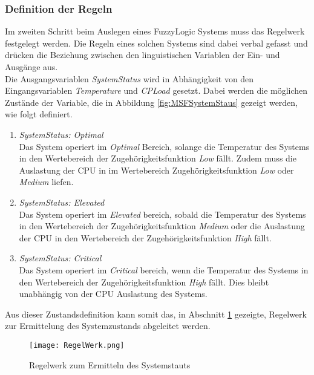 \subsubsection*{Definition der Regeln}
Im zweiten Schritt beim Auslegen eines FuzzyLogic Systems muss das Regelwerk festgelegt werden. Die Regeln eines solchen Systems sind dabei verbal gefasst und drücken die Beziehung zwischen den linguistischen Variablen der Ein- und Ausgänge aus.\cite{FLRegelwerk} \\
Die Ausgangsvariablen \textit{SystemStatus} wird in Abhängigkeit von den Eingangsvariablen \textit{Temperature} und \textit{CPLoad} gesetzt. Dabei werden die möglichen Zustände der Variable, die in Abbildung \ref{fig:MSFSystemStaus} gezeigt werden, wie folgt definiert. 
\begin{enumerate}
    \item \textit{SystemStatus: Optimal}\\
    Das System operiert im \textit{Optimal} Bereich, solange die Temperatur des Systems in den Wertebereich der Zugehörigkeitsfunktion \textit{Low} fällt. Zudem muss die Auslastung der CPU in im Wertebereich Zugehörigkeitsfunktion \textit{Low} oder \textit{Medium} liefen.  
    \item \textit{SystemStatus: Elevated}\\
    Das System operiert im \textit{Elevated} bereich, sobald die Temperatur des Systems in den Wertebereich der Zugehörigkeitsfunktion \textit{Medium} oder die Auslastung der CPU in den Wertebereich der Zugehörigkeitsfunktion \textit{High} fällt.
    \item \textit{SystemStatus: Critical}\\
    Das System operiert im \textit{Critical} bereich, wenn die Temperatur des Systems in den Wertebereich der Zugehörigkeitsfunktion \textit{High} fällt. Dies bleibt unabhängig von der CPU Auslastung des Systems. 
\end{enumerate}
Aus dieser Zustandsdefinition kann somit das, in Abschnitt \ref{fig:FuzzyLogicRuleBase} gezeigte, Regelwerk zur Ermittelung des Systemzustands abgeleitet werden.  
\begin{center}
    \begin{figure}[h!]
        \centering
        \texttt{[image: RegelWerk.png]}
        \caption{Regelwerk zum Ermitteln des Systemstauts}
        \label{fig:FuzzyLogicRuleBase}
    \end{figure}
\end{center}
\vspace{-0.5cm}  


